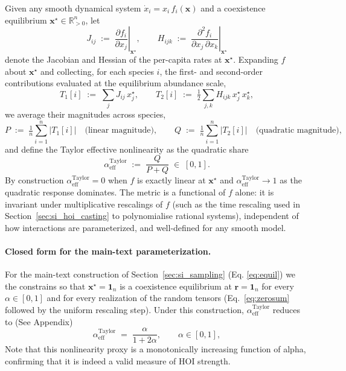 \documentclass[pdflatex,sn-mathphys-num]{sn-jnl}%
\begin{document}
Given any smooth dynamical system $\dot{x}_i = x_i\, f_i(\mathbf{x})$ and a coexistence equilibrium $\mathbf{x}^\star \in \mathbb{R}^n_{>0}$, let
\begin{equation}
  J_{ij} \;:=\; \left.\frac{\partial f_i}{\partial x_j}\right|_{\mathbf{x}^\star},
  \qquad
  H_{ijk} \;:=\; \left.\frac{\partial^2 f_i}{\partial x_j\, \partial x_k}\right|_{\mathbf{x}^\star}
\end{equation}
denote the Jacobian and Hessian of the per-capita rates at $\mathbf{x}^\star$. Expanding $f$ about $\mathbf{x}^\star$ and collecting, for each species $i$, the first- and second-order contributions evaluated at the equilibrium abundance scale,
\begin{equation}\label{eq:T12_def}
  T_1[i] \;:=\; \sum_{j} J_{ij}\, x^\star_j, \qquad
  T_2[i] \;:=\; \tfrac{1}{2}\sum_{j,k} H_{ijk}\, x^\star_j\, x^\star_k,
\end{equation}
we average their magnitudes across species,
\begin{equation}\label{eq:PQ_def}
  P \;:=\; \tfrac{1}{n}\sum_{i=1}^{n} |T_1[i]| \quad\text{(linear magnitude)}, 
  \qquad
  Q \;:=\; \tfrac{1}{n}\sum_{i=1}^{n} |T_2[i]| \quad\text{(quadratic magnitude)},
\end{equation}
and define the Taylor effective nonlinearity as the quadratic share
\begin{equation}\label{eq:alpha_taylor_def}
  \alpha^{\mathrm{Taylor}}_{\mathrm{eff}} \;:=\; \frac{Q}{P + Q} \;\in\; [0, 1].
\end{equation}
By construction $\alpha^{\mathrm{Taylor}}_{\mathrm{eff}} = 0$ when $f$ is exactly linear at $\mathbf{x}^\star$ and $\alpha^{\mathrm{Taylor}}_{\mathrm{eff}} \to 1$ as the quadratic response dominates. The metric is a functional of $f$ alone: it is invariant under multiplicative rescalings of $f$ (such as the time rescaling used in Section~\ref{sec:si_hoi_casting} to polynomialise rational systems), independent of how interactions are parameterized, and well-defined for any smooth model.

\paragraph{Closed form for the main-text parameterization.}
\label{sec:alpha_taylor_closed}

For the main-text construction of Section~\ref{sec:si_sampling} (Eq. \ref{eq:equil}) we the constrains so that $\mathbf{x}^\star = \mathbf{1}_n$ is a coexistence equilibrium at $\mathbf{r} = \mathbf{1}_n$ for every $\alpha \in [0,1]$ and for every realization of the random tensors (Eq.~\eqref{eq:zerosum} followed by the uniform rescaling step). Under this construction, $\alpha^{\mathrm{Taylor}}_{\mathrm{eff}}$ reduces to (See Appendix)
\begin{equation}\label{eq:alpha_taylor_standard}
  \alpha^{\mathrm{Taylor}}_{\mathrm{eff}}\;=\; \frac{\alpha}{1 + 2\alpha}, \qquad \alpha \in [0,1],
\end{equation}
Note that this nonlinearity proxy is a monotonically increasing function of alpha, confirming that it is indeed a valid measure of HOI strength.
\end{document}
